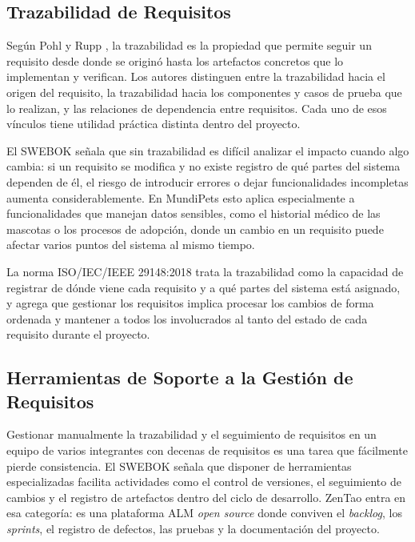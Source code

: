 \documentclass[journal,onecolumn]{IEEEtran}
\begin{document}
\subsection{Trazabilidad de Requisitos}

Según Pohl y Rupp \cite{pohl2015}, la trazabilidad es la propiedad que permite seguir un requisito
desde donde se originó hasta los artefactos concretos que lo implementan y verifican. Los autores
distinguen entre la trazabilidad hacia el origen del requisito, la trazabilidad hacia los
componentes y casos de prueba que lo realizan, y las relaciones de dependencia entre requisitos.
Cada uno de esos vínculos tiene utilidad práctica distinta dentro del proyecto.

El SWEBOK \cite{swebok2024} señala que sin trazabilidad es difícil analizar el impacto cuando
algo cambia: si un requisito se modifica y no existe registro de qué partes del sistema dependen
de él, el riesgo de introducir errores o dejar funcionalidades incompletas aumenta considerablemente.
En MundiPets esto aplica especialmente a funcionalidades que manejan datos sensibles, como el
historial médico de las mascotas o los procesos de adopción, donde un cambio en un requisito puede
afectar varios puntos del sistema al mismo tiempo.

La norma ISO/IEC/IEEE 29148:2018 \cite{iso29148} trata la trazabilidad como la capacidad de
registrar de dónde viene cada requisito y a qué partes del sistema está asignado, y agrega que
gestionar los requisitos implica procesar los cambios de forma ordenada y mantener a todos los
involucrados al tanto del estado de cada requisito durante el proyecto.

\subsection{Herramientas de Soporte a la Gestión de Requisitos}

Gestionar manualmente la trazabilidad y el seguimiento de requisitos en un equipo de varios
integrantes con decenas de requisitos es una tarea que fácilmente pierde consistencia. El SWEBOK
\cite{swebok2024} señala que disponer de herramientas especializadas facilita actividades como el
control de versiones, el seguimiento de cambios y el registro de artefactos dentro del ciclo de
desarrollo. ZenTao entra en esa categoría: es una plataforma ALM \textit{open source} donde
conviven el \textit{backlog}, los \textit{sprints}, el registro de defectos, las pruebas y la
documentación del proyecto.
\end{document}
